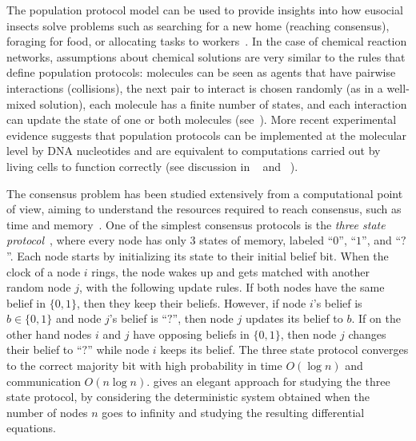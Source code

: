 \documentclass[a4paper,12pt]{article}
\begin{document}
The population protocol model can be used to provide insights into how eusocial insects solve problems such as searching for a new home (reaching consensus), foraging for food, or allocating tasks to workers~\cite{Radeva17}.
In the case of chemical reaction networks, assumptions about chemical solutions are very similar to the rules that define population protocols: molecules can be seen as agents that have pairwise interactions (collisions), the next pair to interact is chosen randomly (as in a well-mixed solution), each molecule has a finite number of states, and each interaction can update the state of one or both molecules (see~\cite{CardelliHDC17}).
More recent experimental evidence suggests that population protocols can be implemented at the molecular level by DNA nucleotides and are equivalent to computations carried out by living cells to function correctly (see discussion in ~\cite{AAEGR17} and ~\cite{CDSPCSS13,CC12}).

The consensus problem has been studied extensively from a computational point of view, aiming to understand the resources required to reach consensus, such as time and memory~\cite{AngluinAER07,DraiefV12,AAEGR17,AlistarhDKSU17,AlistarhAG18,AlistarhG18,BerenbrinkGK20}. One of the simplest consensus protocols is the \emph{three state protocol}~\cite{AAE08}, where every node has only $3$ states of memory, labeled ``$0$”, ``$1$”, and ``$?$”. Each node starts by initializing its state to their initial belief bit. When the clock of a node $i$ rings, the node wakes up and gets matched with another random node $j$, with the following update rules. If both nodes have the same belief in $\{0,1\}$, then they keep their beliefs. However, if node $i$’s belief is $b \in \{0,1\}$ and node $j$’s belief is ``$?$'', then node $j$ updates its belief to $b$. If on the other hand nodes $i$ and $j$ have opposing beliefs in $\{0,1\}$, then node $j$ changes their belief to ``$?$'' while node $i$ keeps its belief. The three state protocol converges to the correct majority bit with high probability in time $O(\log n)$ and communication $O(n \log{n})$. \cite{5062181} gives an elegant approach for studying the three state protocol, by considering the deterministic system obtained when the number of nodes $n$ goes to infinity and studying the resulting differential equations. %
\end{document}
